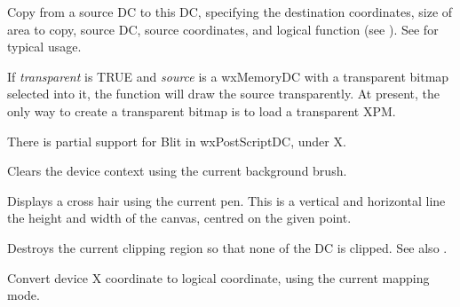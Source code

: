 \label{wxdcblit}


Copy from a source DC to this DC, specifying the destination
coordinates, size of area to copy, source DC, source coordinates, and
logical function (see ).
See  for typical usage.

If {\it transparent} is TRUE and {\it source} is a wxMemoryDC with a transparent
bitmap selected into it, the function will draw the source transparently. At present,
the only way to create a transparent bitmap is to load a transparent XPM.

There is partial support for Blit in wxPostScriptDC, under X.



Clears the device context using the current background brush.

\label{wxdccrosshair}


Displays a cross hair using the current pen. This is a vertical
and horizontal line the height and width of the canvas, centred
on the given point.

\label{wxdcdestroyclippingregion}


Destroys the current clipping region so that none of the DC is clipped.
See also .

\label{wxdcdevicetologicalx}


Convert device X coordinate to logical coordinate, using the current
mapping mode.

\label{wxdcdevicetologicalxrel}


